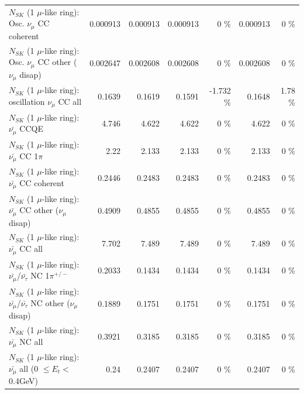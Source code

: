 \begin{table}
\begin{tabular}{| l | r | r | r  r | r  r |}
                        $N_{SK}$ (1 $\mu$-like ring): Osc. $\nu_\mu$ CC coherent &        0.000913 &        0.000913 &        0.000913 &        0 \%  &        0.000913 &        0 \%  \\ 
         $N_{SK}$ (1 $\mu$-like ring): Osc. $\nu_\mu$ CC other ($\nu_\mu$ disap) &        0.002647 &        0.002608 &        0.002608 &        0 \%  &        0.002608 &        0 \%  \\ 
                      $N_{SK}$ (1 $\mu$-like ring): oscillation $\nu_\mu$ CC all &          0.1639 &          0.1619 &          0.1591 &   -1.732 \%  &          0.1648 &     1.78 \%  \\ 
\hline
\hline
                              $N_{SK}$ (1 $\mu$-like ring): $\bar{\nu_\mu}$ CCQE &           4.746 &           4.622 &           4.622 &        0 \%  &           4.622 &        0 \%  \\ 
                         $N_{SK}$ (1 $\mu$-like ring): $\bar{\nu_\mu}$ CC 1$\pi$ &            2.22 &           2.133 &           2.133 &        0 \%  &           2.133 &        0 \%  \\ 
                       $N_{SK}$ (1 $\mu$-like ring): $\bar{\nu_\mu}$ CC coherent &          0.2446 &          0.2483 &          0.2483 &        0 \%  &          0.2483 &        0 \%  \\ 
        $N_{SK}$ (1 $\mu$-like ring): $\bar{\nu_\mu}$ CC other ($\nu_\mu$ disap) &          0.4909 &          0.4855 &          0.4855 &        0 \%  &          0.4855 &        0 \%  \\ 
                          $N_{SK}$ (1 $\mu$-like ring): $\bar{\nu_{\mu}}$ CC all &           7.702 &           7.489 &           7.489 &        0 \%  &           7.489 &        0 \%  \\ 
\hline
  $N_{SK}$ (1 $\mu$-like ring): $\bar{\nu_\mu}$/$\bar{\nu_\tau}$ NC 1$\pi^{+/-}$ &          0.2033 &          0.1434 &          0.1434 &        0 \%  &          0.1434 &        0 \%  \\ 
$N_{SK}$ (1 $\mu$-like ring): $\bar{\nu_\mu}$/$\bar{\nu_\tau}$ NC other ($\nu_\mu$ disap) &          0.1889 &          0.1751 &          0.1751 &        0 \%  &          0.1751 &        0 \%  \\ 
                          $N_{SK}$ (1 $\mu$-like ring): $\bar{\nu_{\mu}}$ NC all &          0.3921 &          0.3185 &          0.3185 &        0 \%  &          0.3185 &        0 \%  \\ 
\hline
   $N_{SK}$ (1 $\mu$-like ring): $\bar{\nu_{\mu}}$ all (0 $\leq E_{t} <$ 0.4GeV) &            0.24 &          0.2407 &          0.2407 &        0 \%  &          0.2407 &        0 \%  \\ 

\end{tabular}
\end{table}
